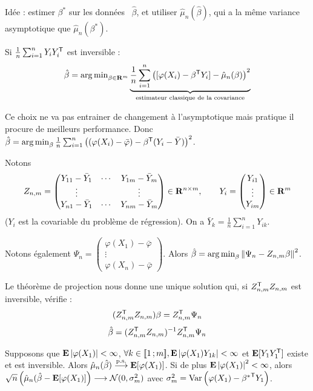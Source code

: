 	Idée : estimer $\beta^*$ sur les données \textrightarrow\ $\hat{\beta}$, et utiliser $\hat{\mu}_n(\hat{\beta})$, qui a la même variance asymptotique que $\hat{\mu}_n(\beta^*)$.
	
	Si $\frac{1}{n} \sum_{i = 1}^n Y_i Y_i^\mathsf{T}$ est inversible :
	$$\hat{\beta} = \operatorname{arg\, min}_{\beta \in \mathbf{R}^m}
	\underset{\text{estimateur classique de la covariance}}{\underbrace{\frac{1}{n} \sum_{i = 1}^n \left( [\varphi(X_i) - \beta^\mathsf{T} Y_i] - \hat{\mu}_n(\beta) \right)^2}}$$
	
	Ce choix ne va pas entrainer de changement à l'asymptotique mais pratique il procure de meilleurs performance.
	Donc $\hat{\beta} = \operatorname{arg\, min}_\beta \frac{1}{n} \sum_{i = 1}^n \left( (\varphi(X_i) - \bar{\varphi}) - \beta^\mathsf{T} (Y_i - \bar{Y}) \right)^2$.
	
	Notons
	$$Z_{n,m} = \begin{pmatrix}
		Y_{11} - \bar{Y}_1 & \cdots & Y_{1m} - \bar{Y}_m \\
		\vdots             &        & \vdots \\
		Y_{n1} - \bar{Y}_1 & \cdots & Y_{nm} - \bar{Y}_m
		\end{pmatrix} \in \mathbf{R}^{n \times m}, \qquad
		Y_i = \begin{pmatrix} Y_{i1} \\ \vdots \\ Y_{im} \end{pmatrix} \in \mathbf{R}^m$$
	($Y_i$ est la covariable du problème de régression).
	On a $\bar{Y}_k = \frac{1}{n} \sum_{i = 1}^n Y_{ik}$.
	
	Notons également $\Psi_n = \begin{pmatrix} \varphi(X_1) - \bar{\varphi} \\ \vdots \\ \varphi(X_n) - \bar{\varphi} \end{pmatrix}$.
	Alors $\hat{\beta} = \operatorname{arg\, min}_{\beta} \left\lVert\Psi_n - Z_{n,m}\beta\right\rVert^2$.
	
	Le théorème de projection nous donne une unique solution qui, si $Z_{n,m}^\mathsf{T} Z_{n,m}$ est inversible, vérifie :
	$$(Z_{n,m}^\mathsf{T} Z_{n,m}) \beta = Z_{n,m}^\mathsf{T} \Psi_n$$
	$$\hat{\beta} = (Z_{n,m}^\mathsf{T} Z_{n,m})^{-1} Z_{n,m}^\mathsf{T} \Psi_n$$
	
	\begin{pop}
		Supposons que $\mathbf{E} \left\lvert\varphi(X_1)\right\rvert < \infty$, $\forall k \in \mathopen{[\![}1\mathclose{}\mathpunct{};m\mathclose{]\!]}, \mathbf{E} \left\lvert\varphi(X_1) Y_{1k}\right\rvert < \infty$ et $\mathbf{E}[Y_1 Y_1^\mathsf{T}]$ existe et est inversible.
		Alors $\hat{\mu}_n(\hat{\beta}) \overset{\text{p.s.}}{\longrightarrow} \mathbf{E}[\varphi(X_1)]$.
		Si de plus $\mathbf{E} \left\lvert\varphi(X_1)\right\rvert^2 < \infty$, alors $\sqrt{n} \left( \hat{\mu}_n(\hat{\beta} - \mathbf{E}[\varphi(X_1)] \right) \longrightarrow \mathcal{N}(0,\sigma_m^2)$ avec $\sigma_m^2 = \operatorname{Var} \left( \varphi(X_1) - {\beta^*}^\mathsf{T} Y_1 \right)$.
	\end{pop}